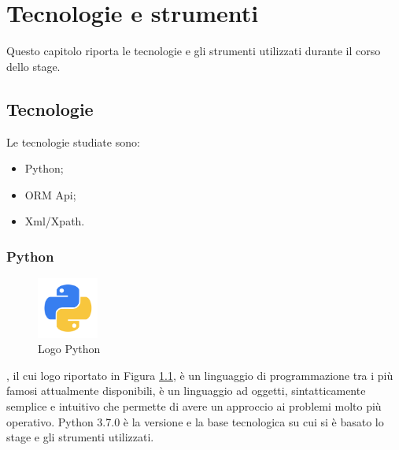 
\hypertarget{(chap:capitolo6)}{}
\chapter{Tecnologie e strumenti}
Questo capitolo riporta le tecnologie e gli strumenti utilizzati durante il corso dello stage.
\section{Tecnologie}
Le tecnologie studiate sono:
\begin{itemize}
\item Python;
\item ORM Api;
\item Xml/Xpath.
\end{itemize}
\subsection{Python}
\begin{figure}[H]
	\begin{center} \includegraphics[width=2cm]{figures/python}
		\caption[Logo Python]{Logo Python} 
		\label{logo_python} 
	\end{center}
\end{figure}
, il cui logo riportato in Figura \ref{logo_python}, è un linguaggio di programmazione tra i più famosi attualmente disponibili, è un linguaggio ad oggetti, sintatticamente semplice e intuitivo che permette di avere un approccio ai problemi molto più operativo. Python 3.7.0 è la versione e la base tecnologica su cui si è basato lo stage e gli strumenti utilizzati.

